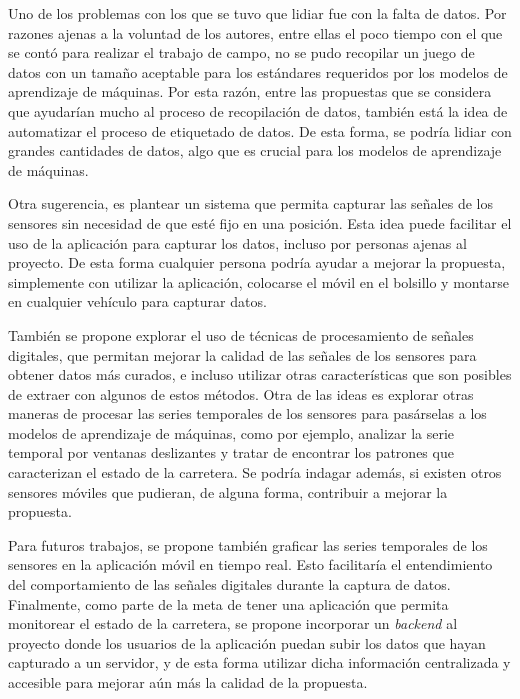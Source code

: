 \begin{recomendations}
	Uno de los problemas con los que se tuvo que lidiar fue con la falta de datos. Por razones ajenas a la voluntad de los autores,
	entre ellas el poco tiempo con el que se contó para realizar el trabajo de campo, no se pudo recopilar un juego de datos con un 
	tamaño aceptable para los estándares requeridos por los modelos de aprendizaje de máquinas. Por esta razón, entre las propuestas
	que se considera que ayudarían mucho al proceso de recopilación de datos, también está la idea de automatizar el proceso de
	etiquetado de datos. De esta forma, se podría lidiar con grandes cantidades de datos, algo que es crucial para los modelos de
	aprendizaje de máquinas.

	Otra sugerencia, es plantear un sistema que permita capturar las señales de los sensores sin necesidad de que
	esté fijo en una posición. Esta idea puede facilitar el uso de la aplicación para capturar los datos, incluso por personas ajenas
	al proyecto. De esta forma cualquier persona podría ayudar a mejorar la propuesta, simplemente con utilizar la aplicación, colocarse
	el móvil en el bolsillo y montarse en cualquier vehículo para capturar datos.

	También se propone explorar el uso de técnicas de procesamiento de señales digitales, que permitan mejorar la calidad de las señales
	de los sensores para obtener datos más curados, e incluso utilizar otras características que son posibles de extraer con algunos de
	estos métodos. Otra de las ideas es explorar otras maneras de procesar las series temporales de los sensores para pasárselas a los
	modelos de aprendizaje de máquinas, como por ejemplo, analizar la serie temporal por ventanas deslizantes y tratar de encontrar los
	patrones que caracterizan el estado de la carretera. Se podría indagar además, si existen otros sensores móviles que pudieran, de
	alguna forma, contribuir a mejorar la propuesta.

	Para futuros trabajos, se propone también graficar las series temporales de los sensores en la aplicación móvil en tiempo real.
	Esto facilitaría el entendimiento del comportamiento de las señales digitales durante la captura de datos. Finalmente, como parte
	de la meta de tener una aplicación que permita monitorear el estado de la carretera, se propone incorporar un \emph{backend} al
	proyecto donde los usuarios de la aplicación puedan subir los datos que hayan capturado a un servidor, y de esta forma utilizar
	dicha información centralizada y accesible para mejorar aún más la calidad de la propuesta.
\end{recomendations}
